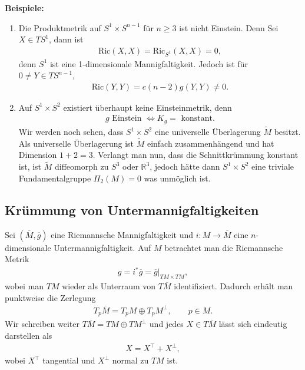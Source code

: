 \documentclass[12pt,a4paper]{article}
\def\R{\mathbb{R}}
\def\Ric{\mathrm{Ric}}
\begin{document}
{\bf Beispiele:}
\begin{enumerate}
  \item Die Produktmetrik auf $S^1\times S^{n-1}$ f\"ur $n\ge 3$ ist nicht
  Einstein. Denn Sei $X\in TS^1$, dann ist
  \begin{align*}
  \Ric(X,X) = \Ric_{S^1}(X,X) = 0,
  \end{align*}
  denn $S^1$ ist eine 1-dimensionale Mannigfaltigkeit. Jedoch ist f\"ur $0\neq
  Y\in TS^{n-1}$,
  \begin{align*}
  \Ric(Y,Y) = c(n-2)g(Y,Y)\neq 0.
  \end{align*}
  \item Auf $S^1\times S^2$ existiert \"uberhaupt keine Einsteinmetrik, denn
  \begin{align*}
  g \text{ Einstein } \Leftrightarrow K_g = \text{ konstant}.
  \end{align*}
  Wir werden noch sehen, dass $S^1\times S^2$ eine universelle \"Uberlagerung
  $\tilde{M}$ besitzt. Als universelle \"Uberlagerung ist $\tilde{M}$ einfach
  zusammenh\"angend und hat Dimension $1+2 = 3$. Verlangt man nun, dass die
  Schnittkr\"ummung konstant ist, ist $\tilde{M}$ diffeomorph zu $S^3$ oder
  $\R^3$, jedoch h\"atte dann $S^1\times S^2$ eine triviale
  Fundamentalgruppe $\Pi_2(M) = 0$ was unm\"oglich ist.
\end{enumerate}

\subsection{Kr\"ummung von Untermannigfaltigkeiten}


\renewcommand{\bar}[1]{\overline{#1}}

Sei $(\bar{M},\bar{g})$ eine Riemannsche Mannigfaltigkeit und $i: M\to \bar{M}$
eine $n$-dimensionale Untermannigfaltigkeit. Auf $M$ betrachtet man die
Riemannsche Metrik 
\begin{align*}
g = i^*\bar{g}  =\bar{g}\big|_{TM\times TM},
\end{align*}
wobei man $TM$ wieder als Unterraum von $T\bar{M}$ identifiziert. Dadurch
erh\"alt man punktweise die Zerlegung
\begin{align*}
T_p\bar{M} = T_pM \oplus T_pM^\bot,\qquad p\in M.
\end{align*}
Wir schreiben weiter $T\bar{M} = TM\oplus TM^\bot$ und jedes $X\in T\bar{M}$
l\"asst sich eindeutig darstellen als
\begin{align*}
X = X^\top + X^\bot,
\end{align*}
wobei $X^\top$ tangential und $X^\bot$ normal zu $TM$ ist.
\end{document}
